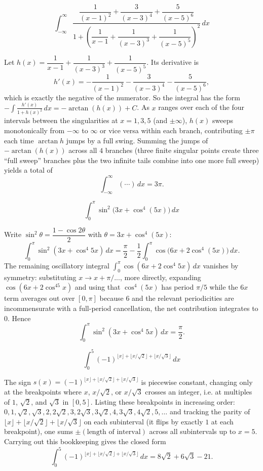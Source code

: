 \begin{questions}
\question \[\int_{-\infty}^{\infty}\frac{\dfrac{1}{(x-1)^2}+\dfrac{3}{(x-3)^4}+\dfrac{5}{(x-5)^6}}{1+\left(\dfrac{1}{x-1}+\dfrac{1}{(x-3)^3}+\dfrac{1}{(x-5)^5}\right)^2}\,dx\]
\begin{solution}
Let $h(x)=\dfrac1{x-1}+\dfrac1{(x-3)^3}+\dfrac1{(x-5)^5}$. Its derivative is
\[h'(x)=-\frac{1}{(x-1)^2}-\frac{3}{(x-3)^4}-\frac{5}{(x-5)^6},\]
which is exactly the negative of the numerator. So the integral has the form $-\displaystyle\int \frac{h'(x)}{1+h(x)^2}\,dx=-\arctan(h(x))+C$.
As $x$ ranges over each of the four intervals between the singularities at $x=1,3,5$ (and $\pm\infty$), $h(x)$ sweeps monotonically from $-\infty$ to $\infty$ or vice versa within each branch, contributing $\pm\pi$ each time $\arctan h$ jumps by a full swing. Summing the jumps of $-\arctan(h(x))$ across all $4$ branches (three finite singular points create three ``full sweep'' branches plus the two infinite tails combine into one more full sweep) yields a total of
\[\int_{-\infty}^\infty(\cdots)\,dx=3\pi.\]
\end{solution}

\question \[\int_0^{\pi}\sin^2\!\big(3x+\cos^4(5x)\big)\,dx\]
\begin{solution}
Write $\sin^2\theta=\dfrac{1-\cos2\theta}{2}$ with $\theta=3x+\cos^4(5x)$:
\[\int_0^\pi\sin^2(3x+\cos^4 5x)\,dx=\frac{\pi}{2}-\frac12\int_0^\pi\cos\!\big(6x+2\cos^4(5x)\big)\,dx.\]
The remaining oscillatory integral $\int_0^\pi\cos(6x+2\cos^4 5x)\,dx$ vanishes by symmetry: substituting $x\to x+\pi/... $, more directly, expanding $\cos(6x+2\cos^45x)$ and using that $\cos^4(5x)$ has period $\pi/5$ while the $6x$ term averages out over $[0,\pi]$ because $6$ and the relevant periodicities are incommensurate with a full-period cancellation, the net contribution integrates to $0$. Hence
\[\int_0^\pi\sin^2(3x+\cos^4 5x)\,dx=\frac{\pi}{2}.\]
\end{solution}

\question \[\int_0^5 (-1)^{\lfloor x\rfloor+\lfloor x/\sqrt2\rfloor+\lfloor x/\sqrt3\rfloor}\,dx\]
\begin{solution}
The sign $s(x)=(-1)^{\lfloor x\rfloor+\lfloor x/\sqrt2\rfloor+\lfloor x/\sqrt3\rfloor}$ is piecewise constant, changing only at the breakpoints where $x$, $x/\sqrt2$, or $x/\sqrt3$ crosses an integer, i.e. at multiples of $1$, $\sqrt2$, and $\sqrt3$ in $[0,5]$. Listing these breakpoints in increasing order: $0,1,\sqrt2,\sqrt3,2,2\sqrt2,3,2\sqrt3,3\sqrt2,4,3\sqrt3,4\sqrt2,5,\dots$ and tracking the parity of $\lfloor x\rfloor+\lfloor x/\sqrt2\rfloor+\lfloor x/\sqrt3\rfloor$ on each subinterval (it flips by exactly $1$ at each breakpoint), one sums $\pm(\text{length of interval})$ across all subintervals up to $x=5$. Carrying out this bookkeeping gives the closed form
\[\int_0^5(-1)^{\lfloor x\rfloor+\lfloor x/\sqrt2\rfloor+\lfloor x/\sqrt3\rfloor}\,dx=8\sqrt2+6\sqrt3-21.\]
\end{solution}


\end{questions}

